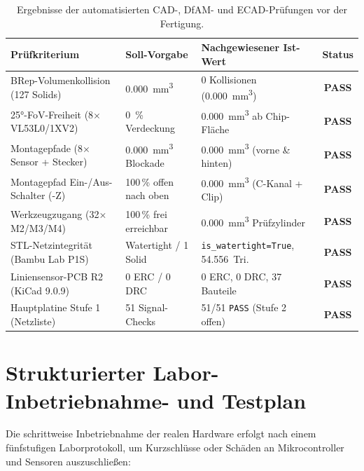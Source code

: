\begin{table}[htbp]
\centering
\caption{Ergebnisse der automatisierten CAD-, DfAM- und ECAD-Prüfungen vor der Fertigung.}
\label{tab:audit_matrix}
\begin{tabular}{@{}p{4.6cm}p{3.6cm}p{4.1cm}c@{}}
\toprule
\textbf{Prüfkriterium} & \textbf{Soll-Vorgabe} & \textbf{Nachgewiesener Ist-Wert} & \textbf{Status} \\
\midrule
BRep-Volumenkollision (127 Solids) & \qty{0,000}{\milli\meter\cubed} & 0 Kollisionen (\qty{0,000}{\milli\meter\cubed}) & \textbf{PASS} \\
25°-FoV-Freiheit (8$\times$ VL53L0/1XV2) & \qty{0}{\percent} Verdeckung & \qty{0,000}{\milli\meter\cubed} ab Chip-Fläche & \textbf{PASS} \\
Montagepfade (8$\times$ Sensor + Stecker) & \qty{0,000}{\milli\meter\cubed} Blockade & \qty{0,000}{\milli\meter\cubed} (vorne \& hinten) & \textbf{PASS} \\
Montagepfad Ein-/Aus-Schalter (-Z) & 100\,\% offen nach oben & \qty{0,000}{\milli\meter\cubed} (C-Kanal + Clip) & \textbf{PASS} \\
Werkzeugzugang (32$\times$ M2/M3/M4) & 100\,\% frei erreichbar & \qty{0,000}{\milli\meter\cubed} Prüfzylinder & \textbf{PASS} \\
STL-Netzintegrität (Bambu Lab P1S) & Watertight / 1 Solid & \texttt{is\_watertight=True}, 54.556~Tri. & \textbf{PASS} \\
Liniensensor-PCB R2 (KiCad 9.0.9) & 0 ERC / 0 DRC & 0 ERC, 0 DRC, 37 Bauteile & \textbf{PASS} \\
Hauptplatine Stufe 1 (Netzliste) & 51 Signal-Checks & 51/51 \texttt{PASS} (Stufe 2 offen) & \textbf{PASS} \\
\bottomrule
\end{tabular}
\end{table}

\section{Strukturierter Labor-Inbetriebnahme- und Testplan}
\label{sec:testplan}
Die schrittweise Inbetriebnahme der realen Hardware erfolgt nach einem fünfstufigen Laborprotokoll, um Kurzschlüsse oder Schäden an Mikrocontroller und Sensoren auszuschließen:

